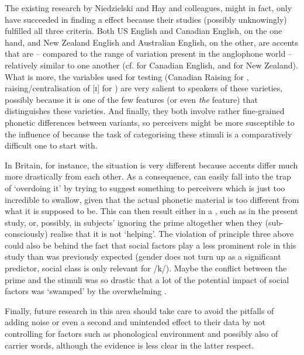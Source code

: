 The existing research by Niedzielski and Hay and colleagues, might in fact, only have succeeded in finding a  effect because their studies (possibly unknowingly) fulfilled all three criteria.
Both US English and Canadian English, on the one hand, and New Zealand English and Australian English, on the other, are accents that are -- compared to the range of variation present in the anglophone world -- relatively similar to one another (cf. \citealt[31]{halford2002} for Canadian English, and \citealt[354]{hayetal2006a} for New Zealand).
What is more, the variables used for testing (Canadian Raising for \citealt{niedzielski1999}, raising/centralisation of [ɪ] for \citealt{hayetal2006a,haydrager2010}) are very salient to speakers of these varieties, possibly because it is one of the few features (or even \emph{the} feature) that distinguishes these varieties.
And finally, they both involve rather fine-grained phonetic differences between variants, so perceivers might be more susceptible to the influence of  because the task of categorising these stimuli is a comparatively difficult one to start with.

In Britain, for instance, the situation is very different because accents differ much more drastically from each other.
As a consequence,  can easily fall into the trap of `overdoing it' by trying to suggest something to perceivers which is just too incredible to swallow, given that the actual phonetic material is too different from what it is supposed to be.
This can then result either in a , such as in the present study, or, possibly, in subjects' ignoring the prime altogether \parencite[like in][]{lawrence2015} when they (sub-consciously) realise that it is not `helping'.
The violation of principle three above could also be behind the fact that social factors play a less prominent role in this study than was previously expected (gender does not turn up as a significant predictor, social class is only relevant for /k/).
Maybe the conflict between the prime and the stimuli was so drastic that a lot of the potential impact of social factors was `swamped' by the overwhelming .

Finally, future research in this area should take care to avoid the pitfalls of adding noise or even a second and unintended  effect to their data by not controlling for factors such as phonological environment and possibly also  of carrier words, although the evidence is less clear in the latter respect.

